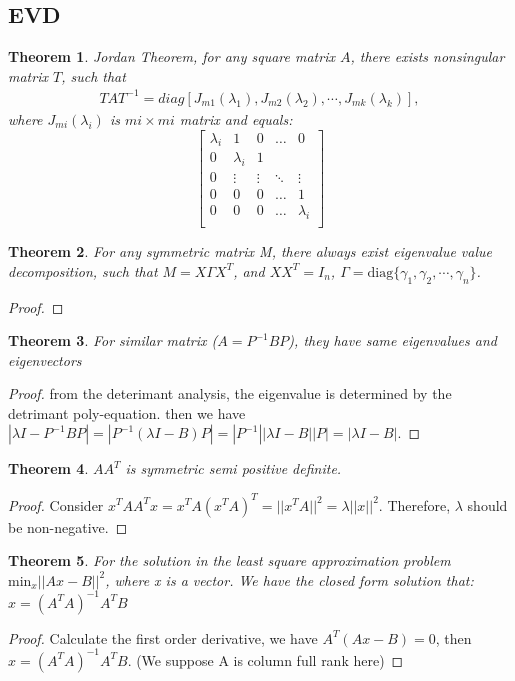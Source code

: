 \documentclass[12pt]{article}
\newtheorem{theorem}{Theorem}[section]
\begin{document}
\subsection{EVD}
\begin{theorem}
	Jordan Theorem, for any square matrix $A$, there exists nonsingular matrix $T$, such that
	\begin{eqnarray}
		TAT^{-1} = diag\left[J_{m1}(\lambda_1),J_{m2}(\lambda_2),\cdots,J_{mk}(\lambda_k)\right],
	\end{eqnarray}
	where $J_{mi}(\lambda_i)$ is $mi\times mi$ matrix and equals:
	\[
	\begin{bmatrix}
		\lambda_i & 1 & 0 & \dots & 0\\
		0 & \lambda_i & 1& \\
		0 & \vdots & \vdots& \ddots&\vdots\\
			0 &0 & 0& \dots &1\\
		0 &0 & 0& \dots &\lambda_i\\
	\end{bmatrix}
	\]
\end{theorem}
\begin{theorem}
	For any symmetric matrix M, there always exist eigenvalue value decomposition, such that $M=X\Gamma X^T$, and $XX^T=I_n$, $\Gamma=\text{diag}\{\gamma_1, \gamma_2,\cdots,\gamma_n\}$.
\end{theorem}
\begin{proof}
	
\end{proof}
\begin{theorem}
	For similar matrix ($A=P^{-1}BP$), they have same eigenvalues and eigenvectors
\end{theorem}
\begin{proof}
	from the deterimant analysis, the eigenvalue is determined by the detrimant poly-equation. then we have $|\lambda I - P^{-1}BP|=|P^{-1}(\lambda I-B)P|=|P^{-1}||\lambda I - B||P|=|\lambda I - B|.$
\end{proof}
\begin{theorem}
	$AA^T$ is symmetric semi positive definite.
\end{theorem}
\begin{proof}
	Consider $x^TAA^Tx=x^TA(x^TA)^T=||x^TA||^2=\lambda||x||^2.$ Therefore, $\lambda$ should be non-negative.
\end{proof}
\begin{theorem}
	For the solution in the least square approximation problem $\text{min}_x||Ax-B||^2$, where x is a vector. We have the closed form solution that: $x={(A^TA)}^{-1}A^TB$
\end{theorem}
\begin{proof}
	Calculate the first order derivative, we have $A^T(Ax-B)=0$, then $x={(A^TA)}^{-1}A^TB$. (We suppose A is column full rank here)
\end{proof}
\end{document}
